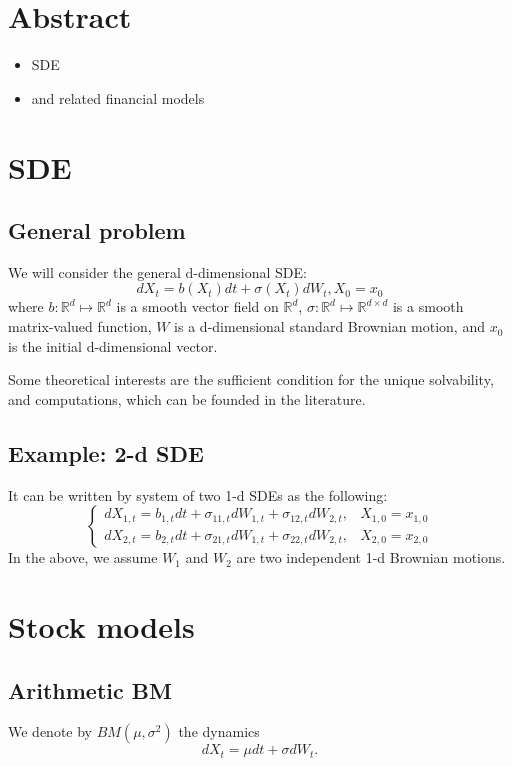 \documentclass{article}
\begin{document}
\section{Abstract}
\begin{itemize}
 \item SDE 
 \item and related financial models
\end{itemize}


\section{SDE}
\subsection{General problem}
We will consider the general d-dimensional SDE:
$$d X_{t} = b(X_{t}) dt + \sigma(X_{t}) dW_{t}, X_{0} = x_{0}$$
where $b: \mathbb R^{d} \mapsto \mathbb R^{d}$ is a smooth 
vector field  on  $\mathbb R^{d}$,
$\sigma: \mathbb R^{d} \mapsto \mathbb R^{d\times d}$ is a smooth 
matrix-valued function, $W$ is a d-dimensional standard Brownian motion, 
and $x_{0}$ is the initial d-dimensional vector. 


Some theoretical interests are the sufficient condition for the unique solvability, and computations, which can be founded in the literature.


\subsection{Example: 2-d SDE}
It can be written by system of two 1-d SDEs as the following:
$$
\left\{
\begin{array}
 {ll}
 d X_{1,t} = b_{1,t} dt + \sigma_{11,t}dW_{1,t} + \sigma_{12,t} dW_{2,t}, 
 & X_{1,0} = x_{1,0}\\
 d X_{2,t} = b_{2,t} dt + \sigma_{21,t}dW_{1,t} + \sigma_{22,t} dW_{2,t}, 
 & X_{2,0} = x_{2,0}
\end{array}
\right.
$$
In the above, we assume $W_{1}$ and $W_{2}$ are two independent 1-d Brownian motions.


\section{Stock models}

\subsection{Arithmetic BM}
We denote by $BM(\mu, \sigma^2)$ the dynamics
$$d X_t = \mu dt + \sigma dW_t.$$
\end{document}
